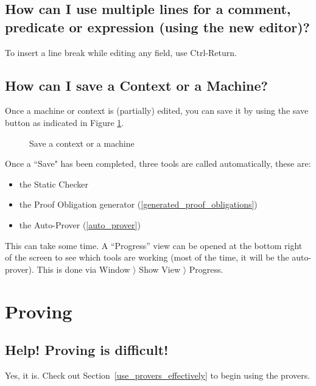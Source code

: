 \subsection{How can I use multiple lines for a comment, predicate or expression (using the new editor)?}

To insert a line break while editing any field, use Ctrl-Return.

\subsection{How can I save a Context or a Machine?}

Once a machine or context is (partially) edited, you can save it by using the save button as indicated in Figure \ref{fig_faq_saveaction}.

\begin{figure}[!ht]
\begin{center}
	\caption{Save a context or a machine}
	\label{fig_faq_saveaction}
\end{center}
\end{figure}

Once a ``Save" has been completed, three tools are called automatically, these are:

\begin{itemize}
	\item the Static Checker
	\item the Proof Obligation generator (\ref{generated_proof_obligations})
	\item the Auto-Prover (\ref{auto_prover})
\end{itemize}

This can take some time. A ``Progress'' view can be opened at the bottom right of the screen to see which tools are working (most of the time, it will be the auto-prover).  This is done via Window $\rangle$ Show View $\rangle$ Progress.

\section{Proving}

\subsection{Help!  Proving is difficult!}

Yes, it is.  Check out Section~\ref{use_provers_effectively} to begin using the provers.

